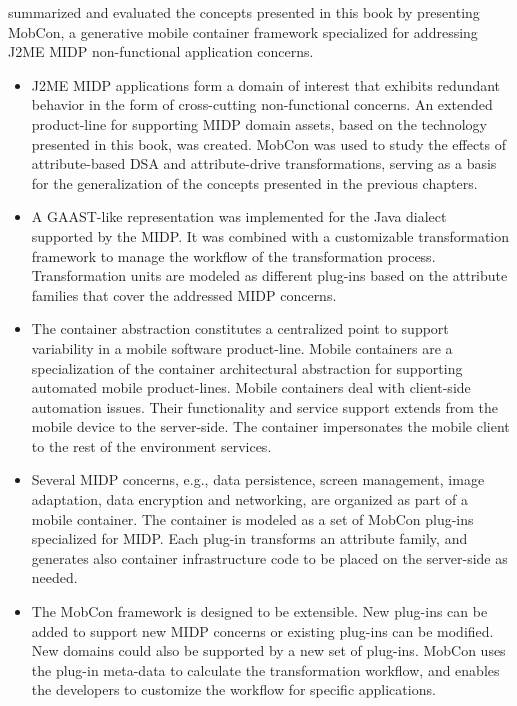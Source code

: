 \noindent \textbf{} summarized and evaluated the concepts presented in this book by presenting MobCon, a generative mobile container framework specialized for addressing J2ME MIDP non-functional application concerns.

\begin{itemize}

\item J2ME MIDP applications form a domain of interest that exhibits redundant behavior in the form of cross-cutting non-functional concerns. An extended product-line for supporting MIDP domain assets, based on the technology presented in this book, was created. MobCon was used to study the effects of attribute-based DSA and attribute-drive transformations, serving as a basis for the generalization of the concepts presented in the previous chapters.

\item A GAAST-like representation was implemented for the Java dialect supported by the MIDP. It was combined with a customizable transformation framework to manage the workflow of the transformation process. Transformation units are modeled as different plug-ins based on the attribute families that cover the addressed MIDP concerns.

\item The container abstraction constitutes a centralized point to support variability in a mobile software product-line. Mobile containers are a specialization of the container architectural abstraction for supporting automated mobile product-lines. Mobile containers deal with client-side automation issues. Their functionality and service support extends from the mobile device to the server-side. The container impersonates the mobile client to the rest of the environment services. 

\item Several MIDP concerns, e.g., data persistence, screen management, image adaptation, data encryption and networking, are organized as part of a mobile container. The container is modeled as a set of MobCon plug-ins specialized for MIDP. Each plug-in transforms an attribute family, and generates also container infrastructure code to be placed on the server-side as needed.

\item The MobCon framework is designed to be extensible. New plug-ins can be added to support new MIDP concerns or existing plug-ins can be modified. New domains could also be supported by a new set of plug-ins. MobCon uses the plug-in meta-data to calculate the transformation workflow, and enables the developers to customize the workflow for specific applications.

\end{itemize}

